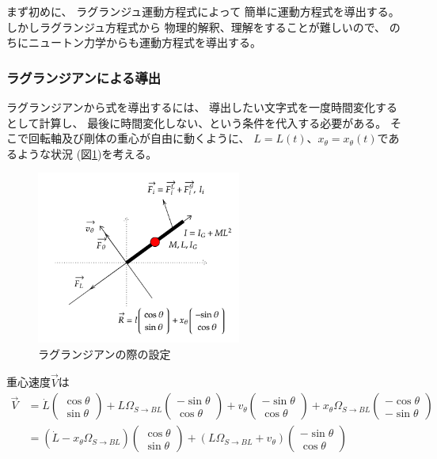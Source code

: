 \documentclass[a4paper,11pt]{jsarticle}
\begin{document}
まず初めに、
ラグランジュ運動方程式によって
簡単に運動方程式を導出する。
しかしラグランジュ方程式から
物理的解釈、理解をすることが難しいので、
のちにニュートン力学からも運動方程式を導出する。

\subsubsection{ラグランジアンによる導出}

ラグランジアンから式を導出するには、
導出したい文字式を一度時間変化するとして計算し、
最後に時間変化しない、という条件を代入する必要がある。
そこで回転軸及び剛体の重心が自由に動くように、
$L=L(t)$、$x_\theta=x_\theta(t)$であるような状況
(図\ref{Appendix_lag_config.png})を考える。

\begin{figure}[h]
  \centering
  \includegraphics[width = 0.6\textwidth]{Appendix_lag_config.png}
  \caption{ラグランジアンの際の設定}
  \label{Appendix_lag_config.png}
\end{figure}

重心速度$\vec{V}$は
\begin{align*}
  \vec{V} &= 
  \dot{L}
  \begin{pmatrix}
    \cos\theta
    \\
    \sin\theta
  \end{pmatrix}
  + L\Omega_{S\rightarrow BL}{}
  \begin{pmatrix}
    -\sin\theta
    \\
    \cos\theta
  \end{pmatrix}
  + v_\theta \begin{pmatrix}
    -\sin\theta
    \\
    \cos\theta
  \end{pmatrix}
  + x_\theta \Omega_{S\rightarrow BL}{} \begin{pmatrix}
    -\cos\theta
    \\
    -\sin\theta
  \end{pmatrix}
  \\
  &= 
  ( \dot{L} - x_\theta \Omega_{S\rightarrow BL}{} )
  \begin{pmatrix}
    \cos\theta
    \\
    \sin\theta
  \end{pmatrix}
  + ( L\Omega_{S\rightarrow BL}{} + v_\theta )
  \begin{pmatrix}
    -\sin\theta
    \\
    \cos\theta
  \end{pmatrix}
\end{align*}
\end{document}
